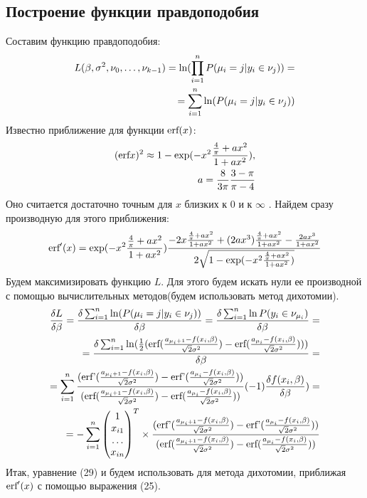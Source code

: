 \documentclass[12pt]{article}
\begin{document}
\subsection{Построение функции правдоподобия}
Составим функцию правдоподобия:
\begin{eqnarray}
    L(\beta,\sigma^2, \nu_0,\dots, \nu_{k-1})=\textup{ln}(\prod_{i=1}^{n}P(\mu_i=j|y_i\in \nu_j))=\\
    =\sum_{i=1}^{n}\ln(P(\mu_i=j|y_i\in \nu_j))
\end{eqnarray}
Известно приближение для функции $\textup{erf}(x)$:
\begin{eqnarray}
    (\textup{erf} x)^2\approx 1- \exp(-x^2 \frac{\frac{4}{\pi}+ax^2}{1+ax^2}),\\
    a=\frac{8}{3\pi}\frac{3-\pi}{\pi -4}
\end{eqnarray}
Оно считается достаточно точным для $x$ близких к $0$ и к $\infty$ \cite{Winitzki}. \hfill\break
Найдем сразу производную для этого приближения:
\begin{eqnarray}
    \textup{erf}'(x) = \exp(-x^2 \frac{\frac{4}{\pi}+ax^2}{1+ax^2}) \frac{-2x\frac{\frac{4}{\pi}+ax^2}{1+ax^2}+(2ax^3)\frac{\frac{4}{\pi}+ax^2}{1+ax^2}-\frac{2ax^3}{1+ax^2}}{2\sqrt{1- \exp(-x^2 \frac{\frac{4}{\pi}+ax^2}{1+ax^2})}}
\end{eqnarray}
Будем максимизировать функцию $L$.
Для этого будем искать нули ее производной с помощью вычислительных методов(будем использовать метод дихотомии).
\begin{eqnarray}
    \frac{\delta L}{\delta \beta}=\frac{\delta \sum_{i=1}^{n}\ln(P(\mu_i=j|y_i\in \nu_j))}{\delta \beta}=\frac{\delta \sum_{i=1}^{n}\ln P(y_i\in \nu_{\mu_i})}{\delta \beta}=\\
    =\frac{\delta \sum_{i=1}^{n} \ln(\frac{1}{2}(\textup{erf}(\frac{a_{\mu_i+1}-f(x_i,\beta)}{\sqrt{2}\sigma^2})-\textup{erf}(\frac{a_{\mu_i}-f(x_i,\beta)}{\sqrt{2}\sigma^2})) )         }{\delta \beta}=\\
    =  \sum_{i=1}^{n} \frac{(\textup{erf'}(\frac{a_{\mu_i+1}-f(x_i,\beta)}{\sqrt{2}\sigma^2})-\textup{erf'}(\frac{a_{\mu_i}-f(x_i,\beta)}{\sqrt{2}\sigma^2}))}{ (\textup{erf}(\frac{a_{\mu_i+1}-f(x_i,\beta)}{\sqrt{2}\sigma^2})-\textup{erf}(\frac{a_{\mu_i}-f(x_i,\beta)}{\sqrt{2}\sigma^2}))}  (-1) \frac{\delta f(x_i,\beta)}{\delta \beta} )=\\
    =-\sum_{i=1}^{n}\begin{pmatrix}
        1\\
        x_{i1}\\
        \dots\\
        x_{in}
    \end{pmatrix}^T\times  \frac{(\textup{erf'}(\frac{a_{\mu_i+1}-f(x_i,\beta)}{\sqrt{2}\sigma^2})-\textup{erf'}(\frac{a_{\mu_i}-f(x_i,\beta)}{\sqrt{2}\sigma^2}))}{ (\textup{erf}(\frac{a_{\mu_i+1}-f(x_i,\beta)}{\sqrt{2}\sigma^2})-\textup{erf}(\frac{a_{\mu_i}-f(x_i,\beta)}{\sqrt{2}\sigma^2}))}
\end{eqnarray}
Итак, уравнение (29) и будем использовать для метода дихотомии, приближая $\textup{erf}'(x)$ с помощью выражения (25).
\end{document}
